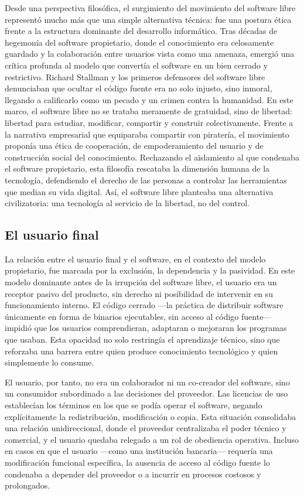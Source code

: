 \documentclass[a4paper,12pt]{article}
\begin{document}
Desde una perspectiva filosófica, el surgimiento del movimiento del software
libre representó mucho más que una simple alternativa técnica: fue una postura
ética frente a la estructura dominante del desarrollo informático. Tras décadas
de hegemonía del software propietario, donde el conocimiento era celosamente
guardado y la colaboración entre usuarios vista como una amenaza, emergió una
crítica profunda al modelo que convertía el software en un bien cerrado y
restrictivo. Richard Stallman y los primeros defensores del software libre
denunciaban que ocultar el código fuente era no solo injusto, sino inmoral,
llegando a calificarlo como un pecado y un crimen contra la humanidad. En este
marco, el software libre no se trataba meramente de gratuidad, sino de libertad:
libertad para estudiar, modificar, compartir y construir colectivamente. Frente
a la narrativa empresarial que equiparaba compartir con piratería, el movimiento
proponía una ética de cooperación, de empoderamiento del usuario y de
construcción social del conocimiento. Rechazando el aislamiento al que condenaba
el software propietario, esta filosofía rescataba la dimensión humana de la
tecnología, defendiendo el derecho de las personas a controlar las herramientas
que median su vida digital. Así, el software libre planteaba una alternativa
civilizatoria: una tecnología al servicio de la libertad, no del control.

\subsection{El usuario final}
La relación entre el usuario final y el software, en el contexto del modelo
propietario, fue marcada por la exclusión, la dependencia y la pasividad. En
este modelo dominante antes de la irrupción del software libre, el usuario era
un receptor pasivo del producto, sin derecho ni posibilidad de intervenir en su
funcionamiento interno. El código cerrado —la práctica de distribuir software
únicamente en forma de binarios ejecutables, sin acceso al código fuente—
impidió que los usuarios comprendieran, adaptaran o mejoraran los programas que
usaban. Esta opacidad no solo restringía el aprendizaje técnico, sino que
reforzaba una barrera entre quien produce conocimiento tecnológico y quien
simplemente lo consume.

El usuario, por tanto, no era un colaborador ni un co-creador del software, sino
un consumidor subordinado a las decisiones del proveedor. Las licencias de uso
establecían los términos en los que se podía operar el software, negando
explícitamente la redistribución, modificación o copia. Esta situación
consolidaba una relación unidireccional, donde el proveedor centralizaba el
poder técnico y comercial, y el usuario quedaba relegado a un rol de obediencia
operativa. Incluso en casos en que el usuario —como una institución bancaria—
requería una modificación funcional específica, la ausencia de acceso al código
fuente lo condenaba a depender del proveedor o a incurrir en procesos costosos y
prolongados.
\end{document}
